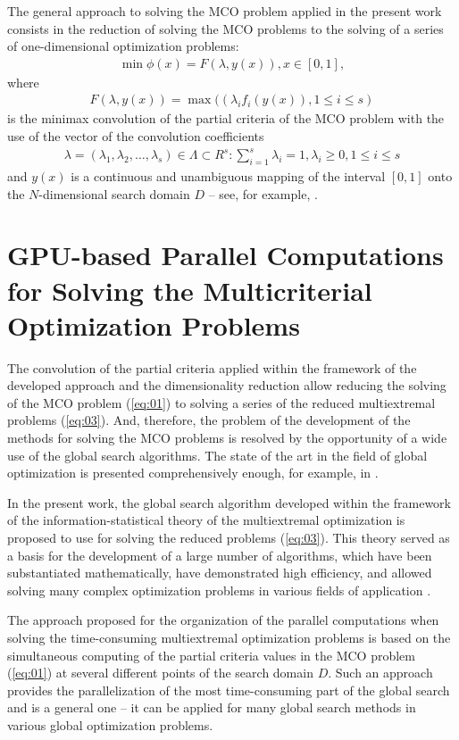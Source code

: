 \documentclass[runningheads]{llncs}
\begin{document}
The general approach to solving the MCO problem applied in the present work consists in the reduction of solving the MCO problems to the solving of a series of one-dimensional optimization problems: 
\begin{eqnarray} \label{eq:03}
\min{⁡ \phi(x)=F(\lambda, y(x)),x \in [0,1]},
\end{eqnarray} 
where 
\begin{eqnarray}
F(\lambda, y(x)) = \max{((\lambda_i f_i (y(x)), 1 \leq i \leq s)}
\end{eqnarray} 
is the minimax convolution of the partial criteria of the MCO problem with the use of the vector of the convolution coefficients 
\begin{eqnarray}
\lambda=(\lambda_1,\lambda_2,\dots,\lambda_s) \in \Lambda \subset R^s : 
\sum_{i=1}^s{\lambda_i=1}, \lambda_i \geq 0, 1 \leq i \leq s	
\end{eqnarray}
and $y(x)$ is a continuous and unambiguous mapping of the interval $[0,1]$ onto the $N$-dimensional search domain $D$ -- see, for example, \cite{c11,c12,c13}.

\section{GPU-based Parallel Computations for Solving the Multicriterial Optimization Problems}\label{sec:03}

The convolution of the partial criteria applied within the framework of the developed approach and the dimensionality reduction allow reducing the solving of the MCO problem (\ref{eq:01}) to solving a series of the reduced multiextremal problems (\ref{eq:03}). And, therefore, the problem of the development of the methods for solving the MCO problems is resolved by the opportunity of a wide use of the global search algorithms. The state of the art in the field of global optimization is presented comprehensively enough, for example, in \cite{c11,c27,c28}.

In the present work, the global search algorithm developed within the framework of the information-statistical theory of the multiextremal optimization is proposed to use for solving the reduced problems (\ref{eq:03}). This theory served as a basis for the development of a large number of algorithms, which have been substantiated mathematically, have demonstrated high efficiency, and allowed solving many complex optimization problems in various fields of application \cite{c11,c12,c29,c30,c32,c33}.

The approach proposed for the organization of the parallel computations when solving the time-consuming multiextremal optimization problems is based on the simultaneous computing of the partial criteria values in the MCO problem (\ref{eq:01}) at several different points of the search domain $D$. Such an approach provides the parallelization of the most time-consuming part of the global search and is a general one -- it can be applied for many global search methods in various global optimization problems.
\end{document}
